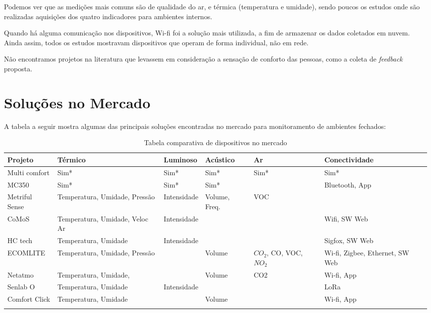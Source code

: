 \documentclass[../monografia.tex]{subfiles}
\begin{document}
Podemos ver que as medições mais comuns são de qualidade do ar, e térmica (temperatura e umidade), sendo poucos os estudos onde são realizadas aquisições dos quatro indicadores para ambientes internos. 

Quando há alguma comunicação nos dispositivos, Wi-fi foi a solução mais utilizada, a fim de armazenar os dados coletados em nuvem. Ainda assim, todos os estudos mostravam dispositivos que operam de forma individual, não em rede. 

Não encontramos projetos na literatura que levassem em consideração a sensação de conforto das pessoas, como a coleta de \textit{feedback} proposta. 

\section{Soluções no Mercado} 

A tabela a seguir mostra algumas das principais soluções encontradas no mercado para monitoramento de ambientes fechados: 

\begin{center}
\begin{longtable}{ | m{2.5cm} | m{2.4cm}| m{2.2cm} |m{2cm} |m{2cm} |m{2.8cm} | } 
\hline
\textbf{Projeto} & \textbf{Térmico} & \textbf{Luminoso} & \textbf{Acústico} & \textbf{Ar} & \textbf{Conectividade} \\ 
\hline
Multi comfort \cite{multicomfort} & Sim* & Sim* & Sim* & Sim* & Sim* \\
\hline
MC350\cite{mc350} & Sim* & Sim* & Sim* & & Bluetooth, App \\
\hline
Metriful Sense\cite{metriful} & Temperatura, Umidade, Pressão & Intensidade & Volume, Freq. & VOC & \\
\hline
CoMoS\cite{CoMoS} & Temperatura, Umidade, Veloc Ar & Intensidade & & & Wifi, SW Web \\ 
\hline
HC tech\cite{HCTech} & Temperatura, Umidade & Intensidade & & & Sigfox, SW Web\\ 
\hline
ECOMLITE \cite{ECOMLITE} & Temperatura, Umidade, Pressão & & Volume & $CO_{2}$, CO, VOC, $NO_{2}$ & Wi-fi, Zigbee, Ethernet, SW Web \\ 
\hline
Netatmo\cite{netatmo} & Temperatura, Umidade, & & Volume & CO2 & Wi-fi, App\\ 
\hline
Senlab O\cite{Senlab} & Temperatura, Umidade & Intensidade & & & LoRa \\ \hline
Comfort Click\cite{comfortclick} & Temperatura, Umidade & & Volume & & Wi-fi, App\\ 
\hline
\caption{Tabela comparativa de dispositivos no mercado}
\label{table}
\end{longtable}
\end{center}
\end{document}
